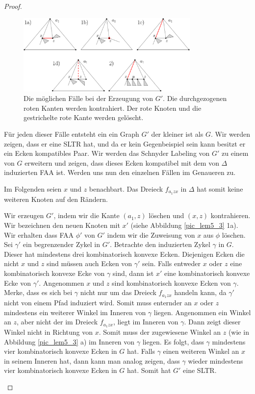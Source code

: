 \begin{proof}
\begin{figure}
	\centering
	  \includegraphics[width=0.8\textwidth]{lem5_2.png}
    	\caption{Die möglichen Fälle bei der Erzeugung von $G'$. Die durchgezogenen roten Kanten werden kontrahiert. Der rote Knoten und die gestrichelte rote Kante werden gelöscht.}
    	\label{pic_lem5_2}
\end{figure}

Für jeden dieser Fälle entsteht ein ein Graph $G'$ der kleiner ist als $G$. Wir werden zeigen, dass er eine SLTR hat, und da er kein Gegenbeispiel sein kann besitzt er ein Ecken kompatibles Paar. Wir werden das Schnyder Labeling von $G'$ zu einem von $G$ erweitern und zeigen, dass dieses Ecken kompatibel mit dem von $\Delta$ induzierten FAA ist. Werden uns nun den einzelnen Fällen im Genaueren zu. 

Im Folgenden seien $x$ und $z$ benachbart. Das Dreieck $f_{a_1zx}$ in $\Delta$ hat somit keine weiteren Knoten auf den Rändern.
\begin{description}[leftmargin =0pt, font = \bfseries]
\item[Fall 1a] Wir erzeugen $G'$, indem wir die Kante $(a_1,z)$ löschen und $(x,z)$ kontrahieren. Wir bezeichnen den neuen Knoten mit $x'$ (siehe Abbildung \ref{pic_lem5_3} 1a). Wir erhalten dass FAA $\phi'$ von $G'$ indem wir die Zuweisung von $x$ aus $\phi$ löschen. Sei $\gamma'$ ein begrenzender Zykel in $G'$. Betrachte den induzierten Zykel $\gamma$ in $G$. Dieser hat mindestens drei kombinatorisch konvexe Ecken. Diejenigen Ecken die nicht $x$ und $z$ sind müssen auch Ecken von $\gamma'$ sein. Falls entweder $x$ oder $z$ eine kombinatorisch konvexe Ecke von $\gamma$ sind, dann ist $x'$ eine kombinatorisch konvexe Ecke von $\gamma'$. Angenommen $x$ und $z$ sind kombinatorisch konvexe Ecken von $\gamma$. Merke, dass es sich bei $\gamma$ nicht nur um das Dreieck $f_{a_1zx}$ handeln kann, da $\gamma'$ nicht von einem Pfad induziert wird. Somit muss enternder an $x$ oder $z$ mindestens ein weiterer Winkel im Inneren von $\gamma$ liegen. Angenommen ein Winkel an $z$, aber nicht der im Dreieck $f_{a_1zx}$, liegt im Inneren von $\gamma$. Dann zeigt dieser Winkel nicht in Richtung von $x$. Somit muss der zugewiesene Winkel an $z$ (wie in Abbildung \ref{pic_lem5_3} a) im Inneren von $\gamma$ liegen. Es folgt, dass $\gamma$ mindestens vier kombinatorisch konvexe Ecken in $G$ hat. Falls $\gamma$ einen weiteren Winkel an $x$ in seinem Inneren hat, dann kann man analog zeigen, dass $\gamma$ wieder mindestens vier kombinatorisch konvexe Ecken in $G$ hat. Somit hat $G'$ eine SLTR.


\end{description}
\end{proof}
